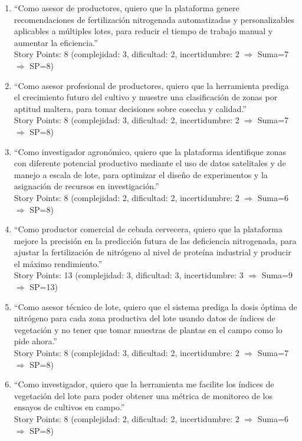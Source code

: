 \documentclass[
11pt, %
]{charter}
\begin{document}
\begin{enumerate}
    \item “Como asesor de productores, quiero que la plataforma genere recomendaciones de fertilización nitrogenada automatizadas y personalizables aplicables a múltiples lotes, para reducir el tiempo de trabajo manual y aumentar la eficiencia.”\\
    Story Points: 8 (complejidad: 3, dificultad: 2, incertidumbre: 2 $\Rightarrow$ Suma=7 $\Rightarrow$ SP=8)

    \item “Como asesor profesional de productores, quiero que la herramienta prediga el crecimiento futuro del cultivo y muestre una clasificación de zonas por aptitud maltera, para tomar decisiones sobre cosecha y calidad.”\\ 
    Story Points: 8 (complejidad: 3, dificultad: 2, incertidumbre: 2 $\Rightarrow$ Suma=7 $\Rightarrow$ SP=8)

    \item “Como investigador agronómico, quiero que la plataforma identifique zonas con diferente potencial productivo mediante el uso de datos satelitales y de manejo a escala de lote, para optimizar el diseño de experimentos y la asignación de recursos en investigación.”\\ 
    Story Points: 8 (complejidad: 2, dificultad: 2, incertidumbre: 2 $\Rightarrow$ Suma=6 $\Rightarrow$ SP=8)

    \item “Como productor comercial de cebada cervecera, quiero que la plataforma mejore la precisión en la predicción futura de las deficiencia nitrogenada, para ajustar la fertilización de nitrógeno al nivel de proteína industrial y producir el máximo rendimiento.”\\ %
    Story Points: 13 (complejidad: 3, dificultad: 3, incertidumbre: 3 $\Rightarrow$ Suma=9 $\Rightarrow$ SP=13)

    \item “Como asesor técnico de lote, quiero que el sistema prediga la dosis óptima de nitrógeno para cada zona productiva del lote usando datos de índices de vegetación y no tener que tomar muestras de plantas en el campo como lo pide ahora.”\\
    Story Points: 8 (complejidad: 3, dificultad: 2, incertidumbre: 2 $\Rightarrow$ Suma=7 $\Rightarrow$ SP=8)

    \item “Como investigador, quiero que la herramienta me facilite los índices de vegetación del lote para poder obtener una métrica de monitoreo de los ensayos de cultivos en campo.”\\ 
    Story Points: 8 (complejidad: 2, dificultad: 2, incertidumbre: 2 $\Rightarrow$ Suma=6 $\Rightarrow$ SP=8)


\end{enumerate}
\end{document}
